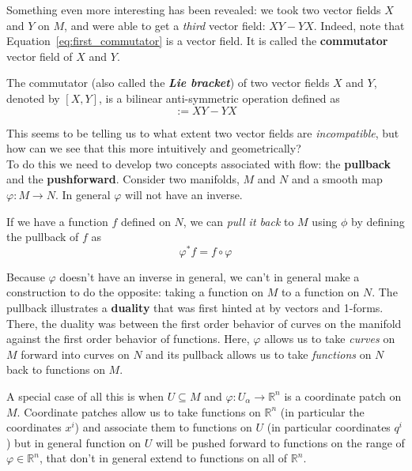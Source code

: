 		Something even more interesting has been revealed: we took two vector fields $X$ and $Y$ on $M$, and were able to get a \emph{third} vector field: $XY-YX$. Indeed, note that Equation~\eqref{eq:first_commutator} is a vector field. It is called the \textbf{commutator} vector field of $X$ and $Y$.
		\begin{defn}[Commutator]
			The commutator (also called the \textbf{\emph{Lie bracket}}) of two vector fields $X$ and $Y$, denoted by $[X,Y]$, is a bilinear anti-symmetric operation defined as
			\begin{equation}
				[X,Y] := X Y - Y X 
			\end{equation}
		\end{defn}
		This seems to be telling us to what extent two vector fields are \emph{incompatible}, but how can we see that this more intuitively and geometrically? \\
		
		To do this we need to develop two concepts associated with flow: the \textbf{pullback} and the \textbf{pushforward}. Consider two manifolds, $M$ and $N$ and a smooth map $\varphi: M \rightarrow N$. In general $\varphi$ will not have an inverse.
		\begin{defn}
			If we have a function $f$ defined on $N$, we can \emph{pull it back} to $M$ using $\phi$ by defining the pullback of $f$ as
			\begin{equation*}
				\varphi^* f = f \circ \varphi
			\end{equation*}
		\end{defn}
		Because $\varphi$ doesn't have an inverse in general, we can't in general make a construction to do the opposite: taking a function on $M$ to a function on $N$. The pullback illustrates a \textbf{duality} that was first hinted at by vectors and 1-forms. There, the duality was between the first order behavior of curves on the manifold against the first order behavior of functions. Here, $\varphi$ allows us to take \emph{curves} on $M$ forward into curves on $N$ and its pullback allows us to take \emph{functions} on $N$ back to functions on $M$. 
		
		A special case of all this is when $U \subseteq M$ and $\varphi: U_\alpha \rightarrow \mathbb R^n$ is a coordinate patch on $M$. Coordinate patches allow us to take functions on $\mathbb R^n$ (in particular the coordinates $x^i$) and associate them to functions on $U$ (in particular coordinates $q^i$) but in general function on $U$ will be pushed forward to functions on the range of $\varphi \in \mathbb R^n$, that don't in general extend to functions on all of $\mathbb R^n$.
		
